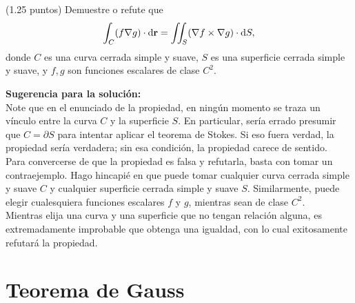 \documentclass{fmbvecto}
\begin{document}
\begin{problema}
    
    (1.25 puntos) Demuestre o refute que 
    \[
    \int_C (f \nabla g) \cdot \mathrm{d}\boldsymbol{{\mathbf{r}}} = \iint_S (\nabla f \times \nabla g) \cdot \mathrm{d}S,
    \]
    donde \(C\) es una curva cerrada simple y suave, \(S\) es una superficie cerrada simple y suave, y \(f, g\) son funciones escalares de clase \(C^2\).

\tcblower
\textbf{Sugerencia para la solución:}\\

    Note que en el enunciado de la propiedad, en ningún momento se traza un vínculo entre la curva \(C\) y la superficie \(S\). En particular, sería errado presumir que \(C = \partial S\) para intentar aplicar el teorema de Stokes. Si eso fuera verdad, la propiedad sería verdadera; sin esa condición, la propiedad carece de sentido. \\
    
    Para convercerse de que la propiedad es falsa y refutarla, basta con tomar un contraejemplo. Hago hincapié en que puede tomar cualquier curva cerrada simple y suave \(C\) y cualquier superficie cerrada simple y suave \(S\). Similarmente, puede elegir cualesquiera funciones escalares \(f\) y \(g\), mientras sean de clase \(C^2\).\\

    Mientras elija una curva y una superficie que no tengan relación alguna, es extremadamente improbable que obtenga una igualdad, con lo cual exitosamente refutará la propiedad.

\end{problema}

\section{Teorema de Gauss}
\end{document}
